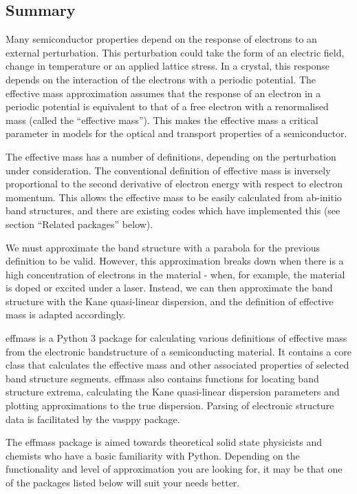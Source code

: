 

\subsection*{Summary}
\label{sec:summary}

Many semiconductor properties depend on the response of electrons to an external perturbation. This perturbation could take the form of an electric field, change in temperature or an applied lattice stress. In a crystal, this response depends on the interaction of the electrons with a periodic potential. The effective mass approximation assumes that the response of an electron in a periodic potential is equivalent to that of a free electron with a renormalised mass (called the ``effective mass''). This makes the effective mass a critical parameter in models for the optical and transport properties of a semiconductor.

The effective mass has a number of definitions, depending on the perturbation under consideration. The conventional definition of effective mass is inversely proportional to the second derivative of electron energy with respect to electron momentum.\autocite[p.~227]{Ashcroft1976} This allows the effective mass to be easily calculated from ab-initio band structures, and there are existing codes which have implemented this (see section ``Related packages'' below).

We must approximate the band structure with a parabola for the previous definition to be valid.\autocite{Ariel2012} However, this approximation breaks down when there is a high concentration of electrons in the material - when, for example, the material is doped or excited under a laser. Instead, we can then approximate the band structure with the Kane quasi-linear dispersion,\autocite{Kane1957} and the definition of effective mass is adapted accordingly.

effmass\autocite{Whalley2018b} is a Python 3 package for calculating various definitions of effective mass from the electronic bandstructure of a semiconducting material. It contains a core class that calculates the effective mass and other associated properties of selected band structure segments. effmass also contains functions for locating band structure extrema, calculating the Kane quasi-linear dispersion parameters and plotting approximations to the true dispersion. Parsing of electronic structure data is facilitated by the vasppy package.\autocite{Morgan2018}

The effmass package is aimed towards theoretical solid state physicists and chemists who have a basic familiarity with Python. Depending on the functionality and level of approximation you are looking for, it may be that one of the packages listed below will suit your needs better.

